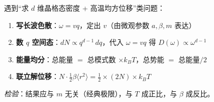 \begin{thinkbox}
遇到``求 $d$ 维晶格态密度 + 高温均方位移''类问题：
\begin{enumerate}
    \item \textbf{写长波色散}：$\omega=vq$，定出 $v$（由微观参数 $a,\beta,m$ 表达）
    \item \textbf{数 $q$ 空间态}：$dN\propto q^{d-1}\,dq$，代入 $\omega=vq$ 得 $D(\omega)\propto\omega^{d-1}$
    \item \textbf{能量均分}：总能量 $=$ 总模式数 $\times k_BT$，总势能 $=$ 总能量$/2$
    \item \textbf{联立解位移}：$N\cdot\frac12\beta\langle r^2\rangle = \frac12\times(2N)\times k_BT$
\end{enumerate}
\textit{检验}：结果应与 $m$ 无关（经典极限），与 $T$ 成正比，与 $\beta$ 成反比。
\end{thinkbox}
